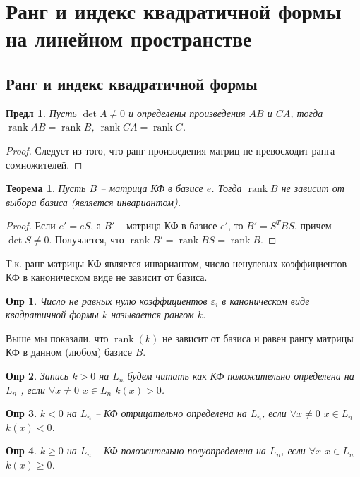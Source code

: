 \documentclass[a4paper,12pt]{article}
\DeclareMathOperator{\rank}{\mathop{rank}}
\newtheorem*{definition}{Опр}
\newtheorem{theorem}{Теорема}[section]
\newtheorem{propos}{Предл}[section]
\begin{document}
\section{Ранг и индекс квадратичной формы на линейном пространстве}
\subsection{Ранг и индекс квадратичной формы}

\begin{propos}
	Пусть $\det A \ne 0$ и определены произведения $AB$ и $CA$, тогда $\rank AB = \rank B$, $\rank CA = \rank C$.
\end{propos}
\begin{proof}
	Следует из того, что ранг произведения матриц не превосходит ранга сомножителей.
\end{proof}

\begin{theorem}
	Пусть $B$ -- матрица КФ в базисе $e$. Тогда $\rank B$ не зависит от выбора базиса (является инвариантом).
\end{theorem}
\begin{proof}
	Если $e' = eS$, а $B'$ -- матрица КФ в базисе $e'$, то $B' = S^T B S$, причем  $\det S \ne 0$. Получается, что $\rank B' = \rank B S = \rank B$.
\end{proof}

Т.к. ранг матрицы КФ является инвариантом, число ненулевых коэффициентов КФ в каноническом виде не зависит от базиса.

\begin{definition}
	Число не равных нулю коэффициентов $\varepsilon_i$ в каноническом виде квадратичной формы $k$ называется рангом $k$.
\end{definition}

Выше мы показали, что $\rank(k)$ не зависит от базиса и равен рангу матрицы КФ в данном (любом) базисе $B$. 

\begin{definition}
	Запись $k > 0$ на $L_n$ будем читать как КФ положительно определена на $L_n$ , если $\forall x \ne 0$ $x \in L_n$  $k(x) > 0$.
\end{definition}

\begin{definition}
	$k < 0$ на $L_n$ -- КФ отрицательно определена на $L_n$, если $\forall x \ne 0$ $x \in L_n$  $k(x) < 0$.
\end{definition}

\begin{definition}
	$k \ge 0$ на $L_n$ -- КФ положительно полуопределена на $L_n$, если $\forall x$ $x \in L_n$  $k(x) \ge 0$.
\end{definition}
\end{document}
